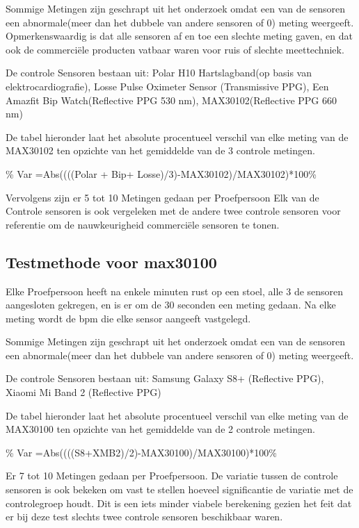 \documentclass[11pt]{article}
\begin{document}
Sommige Metingen zijn geschrapt uit het onderzoek omdat een van de sensoren een abnormale(meer dan het dubbele van andere sensoren of 0) meting weergeeft. Opmerkenswaardig is dat alle sensoren af en toe een slechte meting gaven, en dat ook de commerciële producten vatbaar waren voor ruis of slechte meettechniek.

De controle Sensoren bestaan uit: Polar H10 Hartslagband(op basis van elektrocardiografie), Losse Pulse Oximeter Sensor (Transmissive PPG), Een Amazfit Bip Watch(Reflective PPG 530 nm), MAX30102(Reflective PPG 660 nm)

De tabel hieronder laat het absolute procentueel verschil van elke meting van de MAX30102 ten opzichte van het gemiddelde van de 3 controle metingen.

\% Var =Abs((((Polar + Bip+ Losse)/3)-MAX30102)/MAX30102)*100\%

Vervolgens zijn er 5 tot 10 Metingen gedaan per Proefpersoon
Elk van de Controle sensoren is ook vergeleken met de andere twee controle sensoren voor referentie om de nauwkeurigheid commerciële sensoren te tonen.


\subsection{Testmethode voor max30100}

Elke Proefpersoon heeft na enkele minuten rust op een stoel, alle 3 de sensoren aangesloten gekregen, en is er om de 30 seconden een meting gedaan. Na elke meting wordt de bpm die elke sensor aangeeft vastgelegd.

Sommige Metingen zijn geschrapt uit het onderzoek omdat een van de sensoren een abnormale(meer dan het dubbele van andere sensoren of 0) meting weergeeft.

De controle Sensoren bestaan uit: Samsung Galaxy S8+ (Reflective PPG), Xiaomi Mi Band 2 (Reflective PPG)

De tabel hieronder laat het absolute procentueel verschil van elke meting van de MAX30100 ten opzichte van het gemiddelde van de 2 controle metingen.

\% Var =Abs((((S8+XMB2)/2)-MAX30100)/MAX30100)*100\%

Er 7 tot 10 Metingen gedaan per Proefpersoon. De variatie tussen de controle sensoren is ook bekeken om vast te stellen hoeveel significantie de variatie met de controlegroep houdt. Dit is een iets minder viabele berekening gezien het feit dat er bij deze test slechts twee controle sensoren beschikbaar waren.
\end{document}
